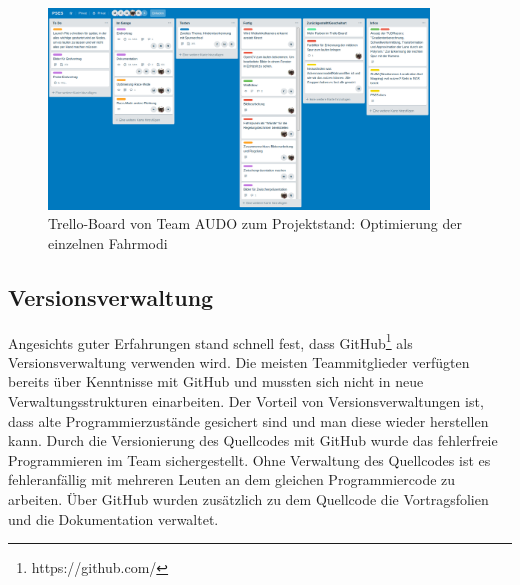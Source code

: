 \begin{figure}[h]
	\centering
	\includegraphics[width=0.9\textwidth]{images/Trello.png}
	\caption{Trello-Board von Team AUDO zum Projektstand: Optimierung der einzelnen Fahrmodi}
	\label{abb:trello-board}
\end{figure}


\subsection{Versionsverwaltung}
\label{sec:versionsverwaltung}
Angesichts guter Erfahrungen stand schnell fest, dass GitHub\footnote{https://github.com/} als Versionsverwaltung verwenden wird. Die meisten Teammitglieder verfügten bereits über Kenntnisse mit GitHub und mussten sich nicht in neue Verwaltungsstrukturen einarbeiten. Der Vorteil von Versionsverwaltungen ist, dass alte Programmierzustände gesichert sind und man diese wieder herstellen kann. Durch die Versionierung des Quellcodes mit GitHub wurde das fehlerfreie Programmieren im Team sichergestellt. Ohne Verwaltung des Quellcodes ist es fehleranfällig  mit mehreren Leuten an dem gleichen Programmiercode zu arbeiten.
Über GitHub wurden zusätzlich zu dem Quellcode die Vortragsfolien und die Dokumentation verwaltet.